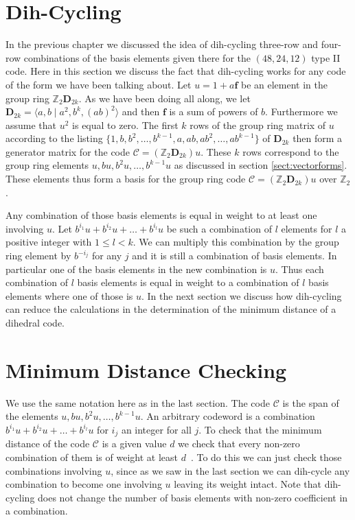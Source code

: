 \section{Dih-Cycling}
In the previous chapter we discussed the idea of dih-cycling three-row and four-row combinations of the basis elements given there for the $(48,24,12)$ type II code.
Here in this section we discuss the fact that dih-cycling works for any code of the form we have been talking about.
Let $u = 1 + a \mathbf{f}$ be an element in the group ring $\mathbb{Z}_2 \mathbf{D}_{2k}$.
As we have been doing all along, we let $\mathbf{D}_{2k} = \langle a , b \mid a^2 , b^k , (ab)^2 \rangle $ and then $\mathbf{f}$ is a sum of powers of $b$.
Furthermore we assume that $u^2$ is equal to zero.
The first $k$ rows of the group ring matrix of $u$ according to the listing $\{1,b,b^2,\ldots,b^{k-1},a,ab,ab^2,\ldots,ab^{k-1}\}$ of $\mathbf{D}_{2k}$ then form a generator matrix for the code $\mathcal{C} = (\mathbb{Z}_2 \mathbf{D}_{2k})u$.
These $k$ rows correspond to the group ring elements $u , b u , b^2 u , \ldots , b^{k-1} u$ as discussed in section \ref{sect:vectorforms}.
These elements thus form a basis for the group ring code $\mathcal{C} = (\mathbb{Z}_2 \mathbf{D}_{2k})u$ over $\mathbb{Z}_2$.

Any combination of those basis elements is equal in weight to at least one involving $u$.
Let $b^{i_1} u + b^{i_2} u + \ldots + b^{i_l} u$ be such a combination of $l$ elements for $l$ a positive integer with $1 \leq l < k$.
We can multiply this combination by the group ring element by $b^{-i_j}$ for any $j$ and it is still a combination of basis elements.
In particular one of the basis elements in the new combination is $u$.
Thus each combination of $l$ basis elements is equal in weight to a combination of $l$ basis elements where one of those is $u$.
In the next section we discuss how dih-cycling can reduce the calculations in the determination of the minimum distance of a dihedral code.

\section{Minimum Distance Checking}
\label{sect:genmindistchecking}
We use the same notation here as in the last section.
The code $\mathcal{C}$ is the span of the elements $u , b u , b^2 u , \ldots , b^{k-1} u$.
An arbitrary codeword is a combination $b^{i_1} u + b^{i_2} u + \ldots + b^{i_l} u$ for $i_j$ an integer for all $j$.
To check that the minimum distance of the code $\mathcal{C}$ is a given value $d$ we check that every non-zero combination of them is of weight at least $d$~\cite[p.~8]{huf03}.
To do this we can just check those combinations involving $u$, since as we saw in the last section we can dih-cycle any combination to become one involving $u$ leaving its weight intact.
Note that dih-cycling does not change the number of basis elements with non-zero coefficient in a combination.

